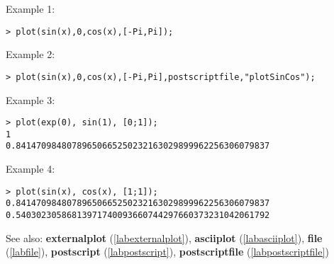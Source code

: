 \noindent Example 1: 
\begin{center}\begin{minipage}{15cm}\begin{Verbatim}[frame=single]
> plot(sin(x),0,cos(x),[-Pi,Pi]);
\end{Verbatim}
\end{minipage}\end{center}
\noindent Example 2: 
\begin{center}\begin{minipage}{15cm}\begin{Verbatim}[frame=single]
> plot(sin(x),0,cos(x),[-Pi,Pi],postscriptfile,"plotSinCos");
\end{Verbatim}
\end{minipage}\end{center}
\noindent Example 3: 
\begin{center}\begin{minipage}{15cm}\begin{Verbatim}[frame=single]
> plot(exp(0), sin(1), [0;1]);
1
0.84147098480789650665250232163029899962256306079837
\end{Verbatim}
\end{minipage}\end{center}
\noindent Example 4: 
\begin{center}\begin{minipage}{15cm}\begin{Verbatim}[frame=single]
> plot(sin(x), cos(x), [1;1]);
0.84147098480789650665250232163029899962256306079837
0.54030230586813971740093660744297660373231042061792
\end{Verbatim}
\end{minipage}\end{center}
See also: \textbf{externalplot} (\ref{labexternalplot}), \textbf{asciiplot} (\ref{labasciiplot}), \textbf{file} (\ref{labfile}), \textbf{postscript} (\ref{labpostscript}), \textbf{postscriptfile} (\ref{labpostscriptfile})
